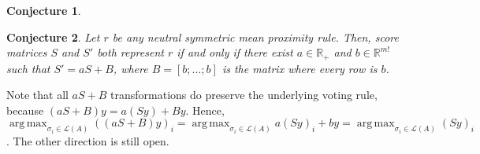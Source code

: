 \documentclass[10pt,letterpaper]{article}
\newcommand{\calL}{{\mathcal{L}}}
\newcommand{\rank}{{\calL(A)}}
\DeclareMathOperator*{\argmax}{arg\,max}
\newtheorem{conjecture}{Conjecture}
\begin{document}
\begin{conjecture}

\end{conjecture}

\begin{conjecture}
Let $r$ be any neutral symmetric mean proximity rule. Then, score matrices $S$ and $S'$ both represent $r$ if and only if there exist $a \in \mathbb{R}_{+}$ and $b \in \mathbb{R}^{m!}$ such that $S' = aS+B$, where $B = [b;\ldots;b]$ is the matrix where every row is $b$. 
\label{conj:equivalent-score-matrix}
\end{conjecture}
Note that all $aS+B$ transformations do preserve the underlying voting rule, because $(aS+B)y = a(Sy)+By$. Hence, $\argmax_{\sigma_i \in \rank} ((aS+B)y)_i = \argmax_{\sigma_i \in \rank} a(Sy)_i + by = \argmax_{\sigma_i \in \rank} (Sy)_i$. The other direction is still open.
\end{document}
